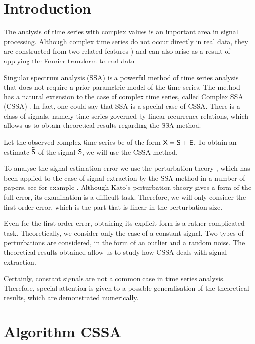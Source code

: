 \documentclass[engproc, submit, article,pdftex,moreauthors]{Definitions/mdpi}
\begin{document}
\section{Introduction}

The analysis of time series with complex values is an important area in signal processing. Although complex time series do not occur directly in real data, they are constructed from two related features \cite{Pang.etal19,Journe.etal2023}) and can also arise as a result of applying the Fourier transform to real data \cite{Trickett2008,YuanWang11}.

Singular spectrum analysis (SSA) \cite{Golyandina.etal2018} is a powerful method of time series analysis that does not require a prior parametric model of the time series. The method has a natural extension to the case of complex time series, called Complex SSA (CSSA) \cite{Kumaresan.Tufts1982,Keppenne.Lall1996}. In fact, one could say that SSA is a special case of CSSA.
There is a class of signals, namely time series governed by linear recurrence relations, which allows us to obtain theoretical results regarding the SSA method.

Let the observed complex time series be of the form $\textsf{X} =\textsf{S} + \textsf{E}$. To obtain an estimate $\widetilde{\textsf{S}}$ of the signal $\textsf{S}$, we will use the CSSA method.

To analyse the signal estimation error we use the perturbation theory \cite{Kato}, which has been applied to the case of signal extraction by the SSA method in a number of papers, see for example \cite{Nekrutkin}.
Although Kato's perturbation theory gives a form of the full error, its examination is a difficult task. Therefore, we will only consider the first order error, which is the part that is linear in the perturbation size.

Even for the first order error, obtaining its explicit form is a rather complicated task. Theoretically, we consider only the case of a constant signal. Two types of perturbations are considered, in the form of an outlier and a random noise. The theoretical results obtained allow us to study how CSSA deals with signal extraction.

Certainly, constant signals are not a common case in time series analysis. Therefore, special attention is given to a possible generalisation of the theoretical results, which are demonstrated numerically.

\section{Algorithm CSSA}
\label{sec:basessa}
\end{document}
